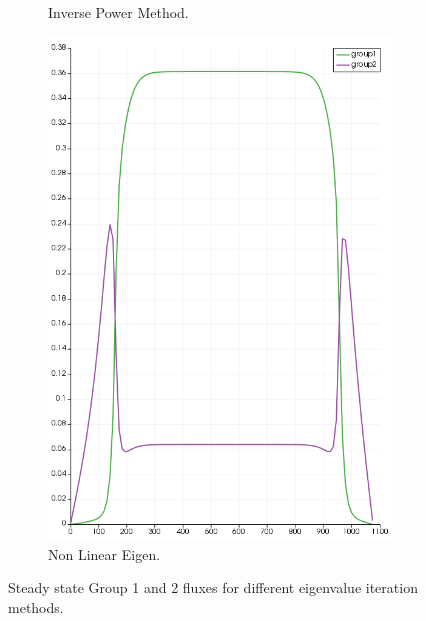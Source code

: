 \documentclass[11pt,letterpaper]{article}
\begin{document}
\begin{figure}[htbp!]
\begin{subfigure}[t]{0.4\textwidth}
			\caption{Inverse Power Method.}
		\end{subfigure}
		\begin{subfigure}[t]{0.4\textwidth}
			\centering
			\includegraphics[width=\linewidth]{1D-fuel-reflec-eig2B}
			\caption{Non Linear Eigen.}
		\end{subfigure}
		\hfill
		\caption{Steady state Group 1 and 2 fluxes for different eigenvalue iteration methods.}
		\label{fig:1D-fuel-reflec-eig2}
	\end{figure}

\pagebreak

% 
\end{document}
